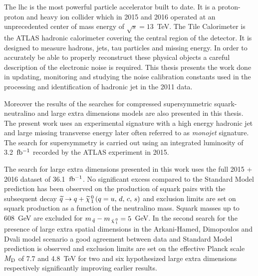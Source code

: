 The \gls{lhc} is the most powerful particle accelerator built to date. It is a
proton-proton and heavy ion collider which in 2015 and 2016 operated at an
unprecedented center of mass energy of $\sqrt{s} = 13$~TeV. The Tile Calorimeter
is the ATLAS hadronic calorimeter covering the central region of the
detector. It is designed to measure hadrons, jets, tau particles and missing
energy. In order to accurately be able to properly reconstruct these physical
objects a careful description of the electronic noise is required. This thesis
presents the work done in updating, monitoring and studying the noise
calibration constants used in the processing and identification of hadronic jet
in the 2011 data.

Moreover the results of the searches for compressed supersymmetric
squark-neutralino and large extra dimensions models are also presented in this
thesis. The present work uses an experimental signature with a high energy
hadronic jet and large missing transverse energy later often referred to as
\emph{monojet} signature. The search for supersymmetry is carried out using an
integrated luminosity of 3.2~$\mbox{fb$^{-1}$}$ recorded by the ATLAS experiment in 2015.

The search for large extra dimensions presented in this work uses the full 2015
+ 2016 dataset of 36.1~$\mbox{fb$^{-1}$}$. No significant excess compared to the Standard
Model prediction has been observed on the production of squark pairs with the
subsequent decay $\widetilde{q} \rightarrow q + \widetilde{\chi}_{\, 1}^{\, 0}\, (q = u,\, d,\, c,\, s)$ and exclusion limits are set on squark production
as a function of the neutralino mass. Squark masses up to 608~GeV are excluded
for $m_{\, \tilde{q}} - m_{\, \tilde{\chi}_{\, 1}^{\, 0}} = 5$~GeV. In the second search for the presence of
large extra spatial dimensions in the Arkani-Hamed, Dimopoulos and Dvali model
scenario a good agreement between data and Standard Model prediction is observed
and exclusion limits are set on the effective Planck scale $M_\mathrm{D}$ of 7.7 and
4.8~TeV for two and six hypothesized large extra dimensions respectively
significantly improving earlier results.
